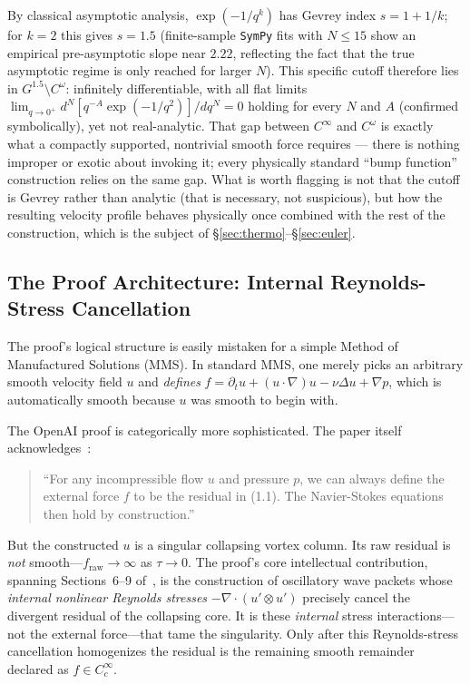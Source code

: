 \documentclass[11pt,a4paper]{article}
\begin{document}
By classical asymptotic analysis, $\exp(-1/q^k)$ has Gevrey index $s = 1 + 1/k$; for $k=2$ this gives
$s = 1.5$ (finite-sample \texttt{SymPy} fits with $N \le 15$ show an empirical pre-asymptotic slope
near $2.22$, reflecting the fact that the true asymptotic regime is only reached for larger $N$). This
specific cutoff therefore lies in $G^{1.5} \setminus C^\omega$: infinitely differentiable, with all
flat limits $\lim_{q \to 0^+} d^N [q^{-A}\exp(-1/q^2)]/dq^N = 0$ holding for every $N$ and $A$
(confirmed symbolically), yet not real-analytic. That gap between $C^\infty$ and $C^\omega$ is exactly
what a compactly supported, nontrivial smooth force requires --- there is nothing improper or exotic
about invoking it; every physically standard ``bump function'' construction relies on the same gap.
What is worth flagging is not that the cutoff is Gevrey rather than analytic (that is necessary, not
suspicious), but how the resulting velocity profile behaves physically once combined with the rest of
the construction, which is the subject of \S\ref{sec:thermo}--\S\ref{sec:euler}.

\subsection{The Proof Architecture: Internal Reynolds-Stress Cancellation}

The proof's logical structure is easily mistaken for a simple Method of Manufactured Solutions
(MMS). In standard MMS, one merely picks an arbitrary smooth velocity field $u$ and
\emph{defines} $f = \partial_t u + (u\cdot\nabla)u - \nu\Delta u + \nabla p$, which is
automatically smooth because $u$ was smooth to begin with.

The OpenAI proof is categorically more sophisticated. The paper itself
acknowledges~\cite{OpenAI2026}:
\begin{quote}
  ``For any incompressible flow $u$ and pressure $p$, we can always define the external force $f$
  to be the residual in (1.1). The Navier-Stokes equations then hold by construction.''
\end{quote}
But the constructed $u$ is a singular collapsing vortex column. Its raw residual is \emph{not}
smooth---$f_{\text{raw}} \to \infty$ as $\tau \to 0$. The proof's core intellectual contribution,
spanning Sections~6--9 of~\cite{OpenAI2026}, is the construction of oscillatory wave packets
whose \emph{internal nonlinear Reynolds stresses} $-\nabla\cdot(u'\otimes u')$ precisely cancel
the divergent residual of the collapsing core. It is these \emph{internal} stress interactions---
not the external force---that tame the singularity. Only after this Reynolds-stress cancellation
homogenizes the residual is the remaining smooth remainder declared as $f \in C_c^\infty$.
\end{document}
